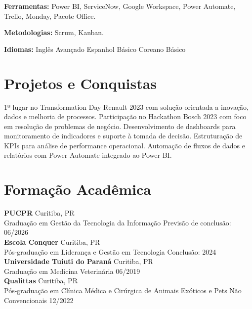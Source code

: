 \documentclass[11pt,a4paper]{article}
\begin{document}
\textbf{Ferramentas:} Power BI, ServiceNow, Google Workspace, Power Automate, Trello, Monday, Pacote Office.

\textbf{Metodologias:} Scrum, Kanban.

\textbf{Idiomas:} Inglês Avançado \enspace\textbullet\enspace Espanhol Básico \enspace\textbullet\enspace Coreano Básico

\section{Projetos e Conquistas}

1º lugar no Transformation Day Renault 2023 com solução orientada a inovação, dados e melhoria de processos. Participação no Hackathon Bosch 2023 com foco em resolução de problemas de negócio. Desenvolvimento de dashboards para monitoramento de indicadores e suporte à tomada de decisão. Estruturação de KPIs para análise de performance operacional. Automação de fluxos de dados e relatórios com Power Automate integrado ao Power BI.

\section{Formação Acadêmica}

\textbf{PUCPR} \hfill Curitiba, PR\\
Graduação em Gestão da Tecnologia da Informação \hfill Previsão de conclusão: 06/2026\\[6pt]

\textbf{Escola Conquer} \hfill Curitiba, PR\\
Pós-graduação em Liderança e Gestão em Tecnologia \hfill Conclusão: 2024\\[6pt]

\textbf{Universidade Tuiuti do Paraná} \hfill Curitiba, PR\\
Graduação em Medicina Veterinária \hfill 06/2019\\[6pt]

\textbf{Qualittas} \hfill Curitiba, PR\\
Pós-graduação em Clínica Médica e Cirúrgica de Animais Exóticos e Pets Não Convencionais \hfill 12/2022
\end{document}
